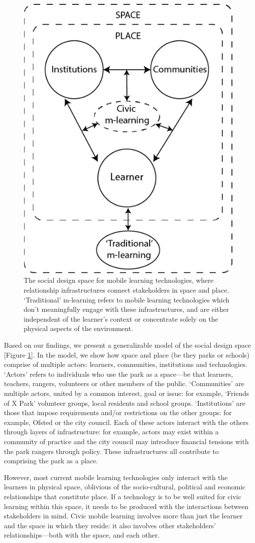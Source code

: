\begin{figure}
  \centering
  \includegraphics[width=0.45\columnwidth]{images/chapter04/designSpace.png}
  \caption[The social design space for mobile learning technologies]{The social design space for mobile learning technologies, where relationship infrastructures connect stakeholders in space and place. `Traditional' m-learning refers to mobile learning technologies which don’t meaningfully engage with these infrastructures, and are either independent of the learner’s context or concentrate solely on the physical aspects of the environment.}
  \label{fig:designSpace}
\end{figure}

Based on our findings, we present a generalizable model of the social design space [Figure \ref{fig:designSpace}]. In the model, we show how space and place (be they parks or schools) comprise of multiple actors: learners, communities, institutions and technologies. `Actors' refers to individuals who use the park as a space—be that learners, teachers, rangers, volunteers or other members of the public. `Communities' are multiple actors, united by a common interest, goal or issue: for example, ‘Friends of X Park’ volunteer groups, local residents and school groups. `Institutions' are those that impose requirements and/or restrictions on the other groups: for example, Ofsted or the city council. Each of these actors interact with the others through layers of infrastructure: for example, actors may exist within a community of practice and the city council may introduce financial tensions with the park rangers through policy. These infrastructures all contribute to comprising the park as a place.

However, most current mobile learning technologies only interact with the learners in physical space, oblivious of the socio-cultural, political and economic relationships that constitute place. If a technology is to be well suited for civic learning within this space, it needs to be produced with the interactions between stakeholders in mind. Civic mobile learning involves more than just the learner and the space in which they reside: it also involves other stakeholders' relationships---both with the space, and each other.

